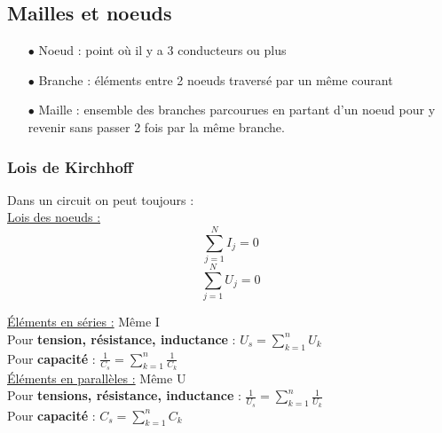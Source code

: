 \documentclass[../main.tex]{subfiles}
\begin{document}
\subsection{Mailles et noeuds}
\begin{itemize}
    \item[$\bullet$] Noeud : point où il y a 3 conducteurs ou plus\\
    \item[$\bullet$] Branche : éléments entre 2 noeuds traversé par un même courant\\
    \item[$\bullet$] Maille : ensemble des branches parcourues en partant d'un noeud pour y revenir sans passer 2 fois par la même branche.
\end{itemize}

\subsubsection{Lois de Kirchhoff} Dans un circuit on peut toujours :\\
\quad \underline{Lois des noeuds :}
\begin{equation}
    \sum_{j=1}^N  I_j = 0
\end{equation}
\begin{equation}
    \sum_{j=1}^NU_j = 0
\end{equation}

\quad \underline{Éléments en séries :} Même I\\
Pour \textbf{tension, résistance, inductance} : $U_s = \sum_{k=1}^nU_k$\\ 
Pour \textbf{capacité} : $\frac{1}{C_s} = \sum_{k=1}^n\frac{1}{C_k}$\\

\quad \underline{Éléments en parallèles :} Même U\\
Pour \textbf{tensions, résistance, inductance} : $\frac{1}{U_s} = \sum_{k=1}^n\frac{1}{U_k}$\\
Pour \textbf{capacité} : $C_s = \sum_{k=1}^nC_k$\\ 
\end{document}

